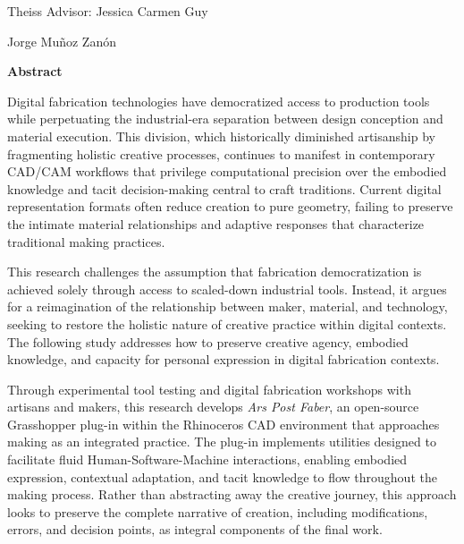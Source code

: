\noindent
\begin{minipage}[t]{0.5\textwidth}
\raggedright
Theiss Advisor: Jessica Carmen Guy
\end{minipage}%
\begin{minipage}[t]{0.5\textwidth}
\raggedleft
Jorge Muñoz Zanón
\end{minipage}
\vspace{1cm}

\begin{center}
{\Large\textbf{Abstract}}
\end{center}
\vspace{0.8cm}

Digital fabrication technologies have democratized access to production tools while perpetuating the industrial-era separation between design conception and material execution. This division, which historically diminished artisanship by fragmenting holistic creative processes, continues to manifest in contemporary CAD/CAM workflows that privilege computational precision over the embodied knowledge and tacit decision-making central to craft traditions. Current digital representation formats often reduce creation to pure geometry, failing to preserve the intimate material relationships and adaptive responses that characterize traditional making practices.

\vspace{0.5cm}

This research challenges the assumption that fabrication democratization is achieved solely through access to scaled-down industrial tools. Instead, it argues for a reimagination of the relationship between maker, material, and technology, seeking to restore the holistic nature of creative practice within digital contexts. The following study addresses how to preserve creative agency, embodied knowledge, and capacity for personal expression in digital fabrication contexts.

\vspace{0.5cm}

Through experimental tool testing and digital fabrication workshops with artisans and makers, this research develops \textit{Ars Post Faber}, an open-source Grasshopper plug-in within the Rhinoceros CAD environment that approaches making as an integrated practice. The plug-in implements utilities designed to facilitate fluid Human-Software-Machine interactions, enabling embodied expression, contextual adaptation, and tacit knowledge to flow throughout the making process. Rather than abstracting away the creative journey, this approach looks to preserve the complete narrative of creation, including modifications, errors, and decision points, as integral components of the final work.

